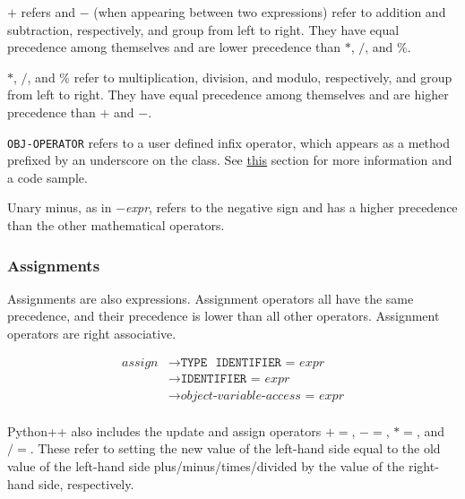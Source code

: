 \documentclass{article}
\begin{document}
\(+\) refers and \(-\) (when appearing between two expressions) refer to addition and subtraction, respectively, and group from left to right. They have equal precedence among themselves and are lower precedence than \(*\), \(/\), and \(\%\).

\(*\), \(/\), and \(\%\) refer to multiplication, division, and modulo, respectively, and group from left to right. They have equal precedence among themselves and are higher precedence than \(+\) and \(-\).

\texttt{OBJ-OPERATOR} refers to a user defined infix operator, which appears as a method prefixed by an underscore on the class. See \hyperref[sec:object-operators]{this} section for more information and a code sample.

Unary minus, as in \(-\)\textit{expr}, refers to the negative sign and has a higher precedence than the other mathematical operators.

\subsubsection{Assignments}
Assignments are also expressions. Assignment operators all have the same precedence, and their precedence is lower than all other operators. Assignment operators are right associative.

\label{sec:assign}
\begin{align*}
    \textit{assign} &\to \texttt{TYPE} \text{ }  \texttt{IDENTIFIER} \texttt{ = } \hyperref[sec:expr]{\textit{expr}} \\
    &\to \texttt{IDENTIFIER} \texttt{ = } \hyperref[sec:expr]{\textit{expr}} \\
    &\to \hyperref[sec:object-variable-access]{\textit{object-variable-access}} \texttt{ = } \hyperref[sec:expr]{\textit{expr}} \\
\end{align*}

Python++ also includes the update and assign operators \(+=\), \(-=\), \(*=\), and \(/=\). These refer to setting the new value of the left-hand side equal to the old value of the left-hand side plus/minus/times/divided by the value of the right-hand side, respectively.
\end{document}
